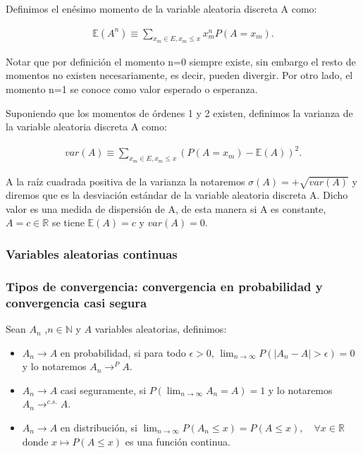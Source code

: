 \documentclass[../proyecto.tex]{memoir}
\begin{document}
Definimos el enésimo momento de la variable aleatoria discreta A como:

\begin{align*}
\mathds{E}(A^n) \equiv \sum_{x_m \in E, x_m \leq x} x_m^n P(A=x_m).
\end{align*}

Notar que por definición el momento n=0 siempre existe, sin embargo el resto de momentos no existen necesariamente, es decir, pueden divergir. Por otro lado, el momento n=1 se conoce como valor esperado o esperanza.

Suponiendo que los momentos de órdenes 1 y 2 existen, definimos la varianza de la variable aleatoria discreta A como:

\begin{align*}
var(A) \equiv \sum_{x_m\in E, x_m \leq x} (P(A=x_m) - \mathds{E}(A))^2.
\end{align*}

A la raíz cuadrada positiva de la varianza la notaremos $\sigma(A)=+\sqrt{var(A)}$ y diremos que es la desviación estándar de la variable aleatoria discreta A. Dicho valor es una medida de dispersión de A, de esta manera si A es constante, $A = c\in \mathds{R}$ se tiene $\mathds{E}(A)=c$ y $var(A) = 0$.

\subsubsection{Variables aleatorias continuas}







\subsubsection{Tipos de convergencia: convergencia en probabilidad y convergencia casi segura}

Sean ${A_n}$ ,$n\in \mathds{N}$ y $A$ variables aleatorias, definimos:

\begin{itemize}

\item $A_n \to A$ en probabilidad, si para todo $\epsilon > 0$, $\lim_{n\to\infty} P( |A_n-A|> \epsilon ) = 0$ y lo notaremos $A_n \to^{P} A$.

\item $A_n \to A$ casi seguramente, si $P(\lim_{n\to\infty} A_n=A) = 1$ y lo notaremos $A_n \to^{c.s.} A$.

\item $A_n \to A$ en distribución, si $\lim_{n \to \infty} P(A_n \leq x) = P(A \leq x),\quad \forall x \in \mathds{R}$ donde $x\mapsto P(A \leq x)$ es una función continua.

\end{itemize}
\end{document}
